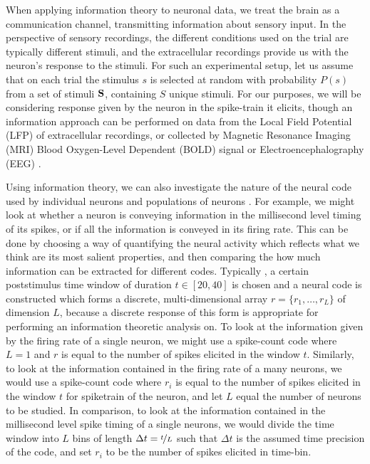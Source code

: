 When applying information theory to neuronal data, we treat the brain as a communication channel, transmitting information about sensory input. 
In the perspective of sensory recordings, the different conditions used on the trial are typically different stimuli, and the extracellular recordings provide us with the neuron's response to the stimuli.
For such an experimental setup, let us assume that on each trial the stimulus $s$ is selected at random with probability $P(s)$ from a set of stimuli $\mathbf{S}$, containing $S$ unique stimuli.
For our purposes, we will be considering response given by the neuron in the spike-train it elicits, though an information approach can be performed on data from the Local Field Potential (LFP) of extracellular recordings, or collected by Magnetic Resonance Imaging (MRI) Blood Oxygen-Level Dependent (BOLD) signal or Electroencephalography (EEG) \cite{Magri2009,Quiroga2009}.

Using information theory, we can also investigate the nature of the neural code used by individual neurons and populations of neurons \cite{Optican1987}.
For example, we might look at whether a neuron is conveying information in the millisecond level timing of its spikes, or if all the information is conveyed in its firing rate.
This can be done by choosing a way of quantifying the neural activity which reflects what we think are its most salient properties, and then comparing the how much information can be extracted for different codes.
Typically \cite{Quiroga2009,Brasselet2012,Panzeri2007,Arabzadeh2006,Strong1998}, a certain poststimulus time window of duration $t \in [20,40]$ is chosen and a neural code is constructed which forms a discrete, multi-dimensional array $r = \{r_1, \ldots, r_L\}$ of dimension $L$, because a discrete response of this form is appropriate for performing an information theoretic analysis on.
To look at the information given by the firing rate of a single neuron, we might use a spike-count code where $L=1$ and $r$ is equal to the number of spikes elicited in the window $t$.
Similarly, to look at the information contained in the firing rate of a many neurons, we would use a spike-count code where $r_i$ is equal to the number of spikes elicited in the window $t$ for spiketrain of the  neuron, and let $L$ equal the number of neurons to be studied.
In comparison, to look at the information contained in the millisecond level spike timing of a single neurons, we would divide the time window into $L$ bins of length $\Delta t = \nicefrac{t}{L}$ such that $\Delta t$ is the assumed time precision of the code, and set $r_i$ to be the number of spikes elicited in  time-bin.

